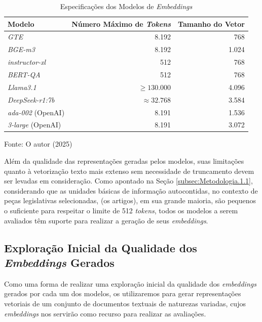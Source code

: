 \begin{table}[H]
    \caption{Especificações dos Modelos de \textit{Embeddings}}
    \centering
    \begin{tabular}{ l r r }
        \hline
        \textbf{Modelo} & \textbf{Número Máximo de \textit{Tokens}} & \textbf{Tamanho do Vetor} \\  
        \hline
        \textit{GTE} & 8.192 & 768 \\
        \textit{BGE-m3} & 8.192 & 1.024 \\
        \textit{instructor-xl} & 512 & 768 \\
        \textit{BERT-QA} & 512 & 768 \\
        \textit{Llama3.1} & $\geq 130.000$ & 4.096 \\
        \textit{DeepSeek-r1:7b} & $\approx 32.768$ & 3.584 \\
        \textit{ada-002} (OpenAI) & 8.191 & 1.536 \\
        \textit{3-large} (OpenAI) & 8.191 & 3.072 \\
        \hline
    \end{tabular}
    
    Fonte: O autor (2025)
    \label{tab:num-maximo-tokens}
\end{table}

Além da qualidade das representações geradas pelos modelos, suas limitações quanto à vetorização texto mais extenso sem necessidade de truncamento devem ser levadas em consideração. Como apontado na Seção \ref{subsec:Metodologia.1.1}, considerando que as unidades básicas de informação autocontidas, no contexto de peças legislativas selecionadas, (os artigos), em sua grande maioria, são pequenos o suficiente para respeitar o limite de 512 \textit{tokens}, todos os modelos a serem avaliados têm suporte para realizar a geração de seus \textit{embeddings}.


\subsection{Exploração Inicial da Qualidade dos \textit{Embeddings} Gerados}
\label{subsec:Metodologia.2.2}

Como uma forma de realizar uma exploração inicial da qualidade dos \textit{embeddings} gerados por cada um dos modelos, os utilizaremos para gerar representações vetoriais de um conjunto de documentos textuais de naturezas variadas, cujos \textit{embeddings} nos servirão como recurso para realizar as avaliações.

